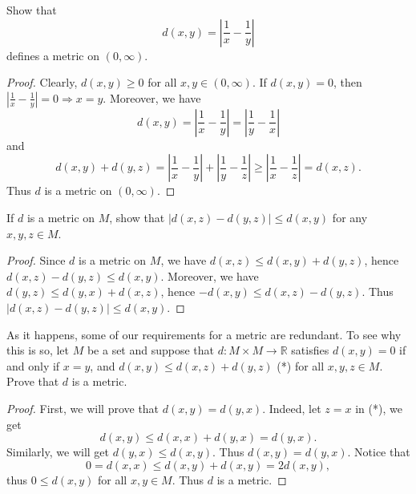 \documentclass[12pt, a4paper]{article}
\theoremstyle{plain}
\newcommand{\R}{\mathbb{R}}
\begin{document}
\begin{exercise}{1}
Show that 
\[
d(x,y)=\left|\frac{1}{x}-\frac{1}{y}\right|
\]
defines a metric on $(0,\infty)$.
\end{exercise}
	\begin{proof}
	Clearly, $d(x,y)\geq 0$ for all $x,y\in (0,\infty)$. If $d(x,y)=0$, then $|\frac{1}{x}-\frac{1}{y}|=0\Rightarrow x=y$. Moreover, we have
	\[
	d(x,y)=\left|\frac{1}{x}-\frac{1}{y}\right|=\left|\frac{1}{y}-\frac{1}{x}\right|
	\]
	and
	\[
	d(x,y)+d(y,z)=\left|\frac{1}{x}-\frac{1}{y}\right|+\left|\frac{1}{y}-\frac{1}{z}\right|\geq \left|\frac{1}{x}-\frac{1}{z}\right|=d(x,z).
	\]
	Thus $d$ is a metric on $(0,\infty)$.
	\end{proof}
	
\begin{exercise}{2}
If $d$ is a metric on $M$, show that $|d(x,z)-d(y,z)|\leq d(x,y)$ for any\\ $x,y,z\in M$.
\end{exercise}
	\begin{proof}
	Since $d$ is a metric on $M$, we have $d(x,z)\leq d(x,y)+d(y,z)$, hence $d(x,z)-d(y,z)\leq d(x,y)$. Moreover, we have $d(y,z)\leq d(y,x)+d(x,z)$, hence $-d(x,y)\leq d(x,z)-d(y,z)$. Thus $|d(x,z)-d(y,z)|\leq d(x,y)$.
	\end{proof}
	
\begin{exercise}{3}
As it happens, some of our requirements for a metric are redundant. To see why
this is so, let $M$ be a set and suppose that $d : M \times M\rightarrow\R$ satisfies $d(x,y) = 0$ if and only if $x = y$, and $d(x,y) \leq d(x,z) + d(y,z)$ (*) for all $x, y, z \in M$. Prove that
$d$ is a metric.
\end{exercise}
	\begin{proof}
	First, we will prove that $d(x,y)=d(y,x)$. Indeed, let $z=x$ in (*), we get
	\[
	d(x,y)\leq d(x,x)+d(y,x)=d(y,x).
	\]
	Similarly, we will get $d(y,x)\leq d(x,y)$. Thus $d(x,y)=d(y,x)$. Notice that
	\[
	0=d(x,x)\leq d(x,y)+d(x,y)=2d(x,y),
	\]
	thus $0\leq d(x,y)$ for all $x,y\in M$. Thus $d$ is a metric.
	\end{proof}
\end{document}
